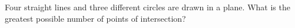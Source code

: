 Four straight lines and three different circles are drawn in a plane. What is the greatest possible number of points of intersection?
